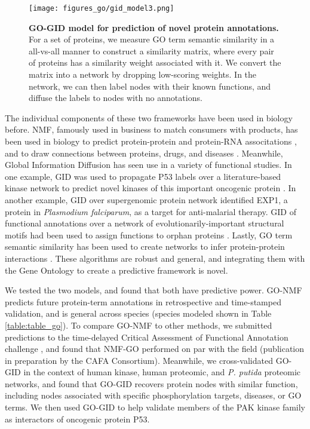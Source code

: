 \documentclass[12pt,a4paper]{report}
\begin{document}

\begin{figure}
\begin{minipage}[c][\textheight]{\textwidth}
\centering
\vspace*{-1in}
  \texttt{[image: figures\_go/gid\_model3.png]}
  \caption[GO-GID model for prediction of novel protein annotations.]{\textbf{GO-GID model for prediction of novel protein annotations.} For a set of proteins, we measure GO term semantic similarity in a all-vs-all manner to construct a similarity matrix, where every pair of proteins has a similarity weight associated with it. We convert the matrix into a network by dropping low-scoring weights. In the network, we can then label nodes with their known functions, and diffuse the labels to nodes with no annotations.}
  \label{fig:gid_model}
 \end{minipage}
\end{figure}

The individual components of these two frameworks have been used in biology before. NMF, famously used in business to match consumers with products, has been used in biology to predict protein-protein and protein-RNA associtations \cite{nmf_example2, nmf_example1}, and to draw connections between proteins, drugs, and diseases \cite{sam_nmf}. Meanwhile, Global Information Diffusion has seen use in a variety of functional studies. In one example, GID was used to propagate P53 labels over a literature-based kinase network to predict novel kinases of this important oncogenic protein \cite{KDD1, NEK2}. In another example, GID over supergenomic protein network identified EXP1, a protein in \textit{Plasmodium falciparum}, as a target for anti-malarial therapy. GID of functional annotations over a network of evolutionarily-important structural motifs had been used to assign functions to orphan proteins \cite{Erdin2013}. Lastly, GO term semantic similarity has been used to create networks to infer protein-protein interactions \cite{go_semantic_ppi1, go_semantic_ppi2}. These algorithms are robust and general, and integrating them with the Gene Ontology to create a predictive framework is novel. 

We tested the two models, and found that both have predictive power. GO-NMF predicts future protein-term annotations in retrospective and time-stamped validation, and is general across species (species modeled shown in Table \ref{table:table_go}). To compare GO-NMF to other methods, we submitted predictions to the time-delayed Critical Assessment of Functional Annotation challenge \cite{cafa2}, and found that NMF-GO performed on par with the field (publication in preparation by the CAFA Consortium). Meanwhile, we cross-validated GO-GID in the context of human kinase, human proteomic, and \textit{P. putida} proteomic networks, and found that GO-GID recovers protein nodes with similar function, including nodes associated with specific phosphorylation targets, diseases, or GO terms. We then used GO-GID to help validate members of the PAK kinase family as interactors of oncogenic protein P53.
\end{document}
